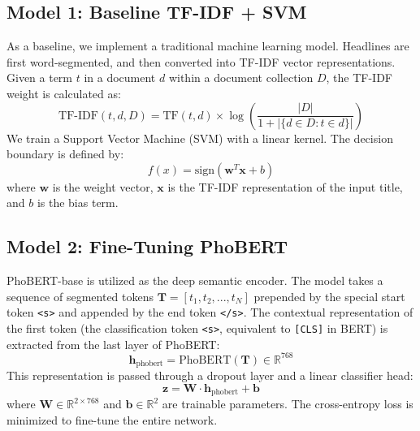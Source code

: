 \documentclass[conference]{IEEEtran}
\begin{document}
\subsection{Model 1: Baseline TF-IDF + SVM}
As a baseline, we implement a traditional machine learning model. Headlines are first word-segmented, and then converted into TF-IDF vector representations.
Given a term $t$ in a document $d$ within a document collection $D$, the TF-IDF weight is calculated as:
\begin{equation}
\text{TF-IDF}(t, d, D) = \text{TF}(t, d) \times \log\left(\frac{|D|}{1 + |\{d \in D : t \in d\}|}\right)
\end{equation}
We train a Support Vector Machine (SVM) with a linear kernel. The decision boundary is defined by:
\begin{equation}
f(x) = \text{sign}(\mathbf{w}^T \mathbf{x} + b)
\end{equation}
where $\mathbf{w}$ is the weight vector, $\mathbf{x}$ is the TF-IDF representation of the input title, and $b$ is the bias term.

\subsection{Model 2: Fine-Tuning PhoBERT}
PhoBERT-base is utilized as the deep semantic encoder. The model takes a sequence of segmented tokens $\mathbf{T} = [t_1, t_2, ..., t_N]$ prepended by the special start token \texttt{<s>} and appended by the end token \texttt{</s>}.
The contextual representation of the first token (the classification token \texttt{<s>}, equivalent to \texttt{[CLS]} in BERT) is extracted from the last layer of PhoBERT:
\begin{equation}
\mathbf{h}_{\text{phobert}} = \text{PhoBERT}(\mathbf{T}) \in \mathbb{R}^{768}
\end{equation}
This representation is passed through a dropout layer and a linear classifier head:
\begin{equation}
\mathbf{z} = \mathbf{W} \cdot \mathbf{h}_{\text{phobert}} + \mathbf{b}
\end{equation}
where $\mathbf{W} \in \mathbb{R}^{2 \times 768}$ and $\mathbf{b} \in \mathbb{R}^2$ are trainable parameters. The cross-entropy loss is minimized to fine-tune the entire network.
\end{document}
